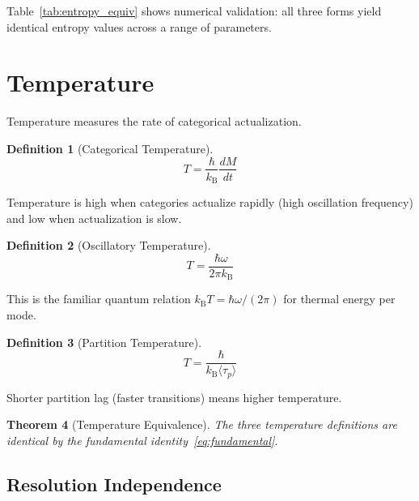 \documentclass[twocolumn,10pt]{article}
\newtheorem{theorem}{Theorem}[section]
\theoremstyle{definition}
\newtheorem{definition}[theorem]{Definition}
\theoremstyle{remark}
\newcommand{\kB}{k_{\mathrm{B}}}
\begin{document}
Table~\ref{tab:entropy_equiv} shows numerical validation: all three forms yield identical entropy values across a range of parameters.

\section{Temperature}
\label{sec:temperature}

Temperature measures the rate of categorical actualization.

\begin{definition}[Categorical Temperature]
\begin{equation}
T = \frac{\hbar}{\kB} \frac{dM}{dt}
\label{eq:categorical_temp}
\end{equation}
\end{definition}

Temperature is high when categories actualize rapidly (high oscillation frequency) and low when actualization is slow.

\begin{definition}[Oscillatory Temperature]
\begin{equation}
T = \frac{\hbar\omega}{2\pi \kB}
\label{eq:oscillatory_temp}
\end{equation}
\end{definition}

This is the familiar quantum relation $\kB T = \hbar\omega/(2\pi)$ for thermal energy per mode.

\begin{definition}[Partition Temperature]
\begin{equation}
T = \frac{\hbar}{\kB \langle\tau_p\rangle}
\label{eq:partition_temp}
\end{equation}
\end{definition}

Shorter partition lag (faster transitions) means higher temperature.

\begin{theorem}[Temperature Equivalence]
The three temperature definitions are identical by the fundamental identity~\eqref{eq:fundamental}.
\end{theorem}

\subsection{Resolution Independence}
\end{document}
